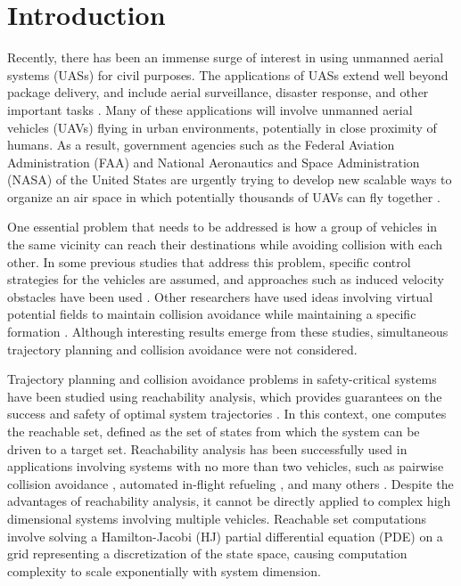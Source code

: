 \section{Introduction}
Recently, there has been an immense surge of interest in using unmanned aerial systems (UASs) for civil purposes. The applications of UASs extend well beyond package delivery, and include aerial surveillance, disaster response, and other important tasks \cite{Tice91, Debusk10, Amazon16, AUVSI16, BBC16}. Many of these applications will involve unmanned aerial vehicles (UAVs) flying in urban environments, potentially in close proximity of humans. As a result, government agencies such as the Federal Aviation Administration (FAA) and National Aeronautics and Space Administration (NASA) of the United States are urgently trying to develop new scalable ways to organize an air space in which potentially thousands of UAVs can fly together \cite{FAA13, NASA16,Kopardekar16}.

One essential problem that needs to be addressed is how a group of vehicles in the same vicinity can reach their destinations while avoiding collision with each other. In some previous studies that address this problem, specific control strategies for the vehicles are assumed, and approaches such as induced velocity obstacles have been used \cite{Fiorini98, Chasparis05, Vandenberg08}. Other researchers have used ideas involving virtual potential fields to maintain collision avoidance while maintaining a specific formation \cite{Saber02, Chuang07}. Although interesting results emerge from these studies, simultaneous trajectory planning and collision avoidance were not considered. 

Trajectory planning and collision avoidance problems in safety-critical systems have been studied using reachability analysis, which provides guarantees on the success and safety of optimal system trajectories \cite{Barron90, Mitchell05, Bokanowski10, Bokanowski11, Margellos11, Fisac15}. In this context, one computes the reachable set, defined as the set of states from which the system can be driven to a target set. Reachability analysis has been successfully used in applications involving systems with no more than two vehicles, such as pairwise collision avoidance \cite{Mitchell05}, automated in-flight refueling \cite{Ding08}, and many others \cite{Huang11, Bayen07}. Despite the advantages of reachability analysis, it cannot be directly applied to complex high dimensional systems involving multiple vehicles. Reachable set computations involve solving a Hamilton-Jacobi (HJ) partial differential equation (PDE) on a grid representing a discretization of the state space, causing computation complexity to scale exponentially with system dimension. 

